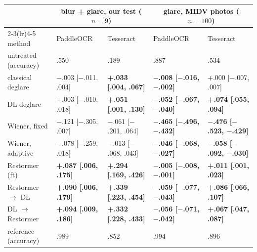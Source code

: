 \begin{tabular}{lllll}
\toprule
 & \multicolumn{2}{c}{blur + glare, our test ($n=9$)} & \multicolumn{2}{c}{glare, MIDV photos ($n=100$)} \\
\cmidrule(lr){2-3}\cmidrule(lr){4-5}
method & PaddleOCR & Tesseract & PaddleOCR & Tesseract \\
\midrule
untreated (accuracy) & .550 & .189 & .887 & .534 \\
\midrule
classical deglare & $-$.003 [$-$.011, .004] & \textbf{+.033 [.004, .067]} & \textbf{$-$.008 [$-$.016, $-$.002]} & +.000 [$-$.007, .007] \\
DL deglare & +.003 [$-$.010, .018] & \textbf{+.051 [.001, .130]} & \textbf{$-$.052 [$-$.067, $-$.040]} & \textbf{+.074 [.055, .094]} \\
Wiener, fixed & $-$.121 [$-$.305, .007] & $-$.061 [$-$.201, .064] & \textbf{$-$.465 [$-$.496, $-$.432]} & \textbf{$-$.476 [$-$.523, $-$.429]} \\
Wiener, adaptive & $-$.078 [$-$.259, .018] & $-$.013 [$-$.068, .043] & \textbf{$-$.046 [$-$.068, $-$.027]} & \textbf{$-$.058 [$-$.092, $-$.030]} \\
Restormer (ft) & \textbf{+.087 [.006, .175]} & \textbf{+.294 [.169, .426]} & \textbf{$-$.005 [$-$.008, $-$.001]} & \textbf{+.011 [.001, .023]} \\
Restormer $\rightarrow$ DL & \textbf{+.090 [.006, .179]} & \textbf{+.339 [.223, .454]} & \textbf{$-$.059 [$-$.077, $-$.043]} & \textbf{+.086 [.066, .107]} \\
DL $\rightarrow$ Restormer & \textbf{+.094 [.009, .186]} & \textbf{+.332 [.228, .433]} & \textbf{$-$.056 [$-$.071, $-$.042]} & \textbf{+.067 [.047, .087]} \\
\midrule
reference (accuracy) & .989 & .852 & .994 & .896 \\
\bottomrule
\end{tabular}
